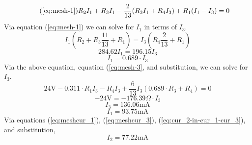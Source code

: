\documentclass{article}
\begin{document}
	\begin{equation}\tag{\ref{eq:mesh-1}}
		R_2I_1 + R_3I_1-\frac{2}{13}(R_3I_1 + R_4I_3) + R_1(I_1-I_3) = 0
	\end{equation}
	Via equation (\ref{eq:mesh-1}) we can solve for $I_1$ in terms of $I_3$.
	$$ I_1\left(R_2+R_3\frac{11}{13}+R_1 \right)=I_3 \left( R_4 
	\frac{2}{13}+R_1\right)$$
	$$ 284.62I_1 = 196.15I_3$$
	\begin{equation}\label{eq:mesh_1-in-mesh_3}
		I_1 = 0.689 \cdot I_3
	\end{equation}
	Via the above equation, equation (\ref{eq:mesh-3}, and substitution, we can 
	solve for $I_3$.
	$$ 24\text{V} -0.311\cdot R_1I_3 - R_4I_3 + \frac{6}{13}I_3(0.689\cdot 
	R_3+R_4)=0$$
	$$ -24\text{V} = -176.39 \Omega \cdot I_3$$
	\begin{equation}\label{eq:meshcur_3}
		I_3 = 136.06\text{mA}
	\end{equation}
	\begin{equation}\label{eq:meshcur_1}
		I_1 = 93.75\text{mA}
	\end{equation}
	Via equations (\ref{eq:meshcur_1}), (\ref{eq:meshcur_3}), 
	(\ref{eq:cur_2-in-cur_1-cur_3}), and substitution,
	$$ I_2=77.22\text{mA}$$
\end{document}
